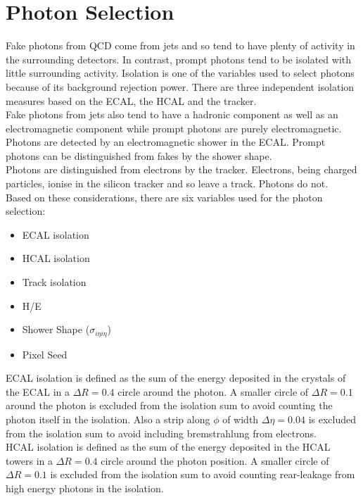 \section{Photon Selection}

Fake photons from QCD come from jets and so tend to have plenty of activity in
the surrounding detectors. In contrast, prompt photons tend to be isolated with
little surrounding activity. Isolation is one of the variables used to select 
photons because of its background rejection power. There are three independent 
isolation measures based on the ECAL, the HCAL and the tracker. \\

Fake photons from jets also tend to have a hadronic component as well as an
electromagnetic component while prompt photons are purely electromagnetic. \\ 

Photons are detected by an electromagnetic shower in the ECAL. Prompt photons
can be distinguished from fakes by the shower shape. \\

Photons are distinguished from electrons by the tracker. Electrons, being
charged particles, ionise in the silicon tracker and so leave a track. Photons
do not. \\ 

Based on these considerations, there are six variables used for the photon 
selection:

\begin{itemize}
\item ECAL isolation
\item HCAL isolation
\item Track isolation
\item H/E
\item Shower Shape ($\sigma_{i\eta i\eta}$)
\item Pixel Seed
\end{itemize}

ECAL isolation is defined as the sum of the energy deposited in the crystals of 
the ECAL in a $\Delta R = 0.4$ circle around the photon. A smaller circle of 
$\Delta R = 0.1$ around the photon is excluded from the isolation sum to avoid 
counting the photon itself in the isolation. Also a strip along $\phi$ of width 
$\Delta \eta = 0.04$ is excluded from the isolation sum to avoid including 
bremstrahlung from electrons. \\

HCAL isolation is defined as the sum of the energy deposited in the HCAL towers
in a $\Delta R = 0.4$ circle around the photon position. A smaller circle of 
$\Delta R = 0.1$ is excluded from the isolation sum to avoid counting 
rear-leakage from high energy photons in the isolation. \\ 


